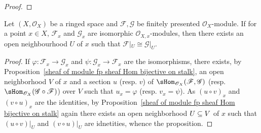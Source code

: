 \begin{proof}

\end{proof}
\begin{proposition}\label{sheaf of module fp isomorphic on stalk}
Let $(X,\mathscr{O}_X)$ be a ringed space and $\mathscr{F},\mathscr{G}$ be finitely presented $\mathscr{O}_X$-module. If for a point $x\in X$, $\mathscr{F}_x$ and $\mathscr{G}_x$ are isomorphic $\mathscr{O}_{X,x}$-modules, then there exists an open neighbourhood $U$ of $x$ such that $\mathscr{F}|_U\cong\mathscr{G}|_U$.
\end{proposition}
\begin{proof}
If $\varphi:\mathscr{F}_x\to\mathscr{G}_x$ and $\psi:\mathscr{G}_x\to\mathscr{F}_x$ are the isomorphisms, there exists, by Proposition~\ref{sheaf of module fp sheaf Hom bijective on stalk}, an open neighborhood $V$ of $x$ and a section $u$ (resp. $v$) of $\sHom_{\mathscr{O}_X}(\mathscr{F},\mathscr{G})$ (resp. $\sHom_{\mathscr{O}_X}(\mathscr{G}\circ\mathscr{F})$) over $V$ such that $u_x=\varphi$ (resp. $v_x=\psi$). As $(u\circ v)_x$ and $(v\circ u)_x$ are the identities, by Proposition~\ref{sheaf of module fp sheaf Hom bijective on stalk} again there exists an open neighborhood $U\subseteq V$ of $x$ such that $(u\circ v)|_U$ and $(v\circ u)|_U$ are idnetities, whence the proposition.
\end{proof}
